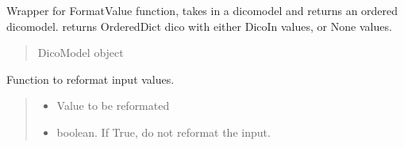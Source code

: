 \documentclass[letterpaper,10pt,english]{sphinxmanual}
\begin{document}
\begin{fulllineitems}
\label{\detokenize{api/killMS.Parset:killMS.Parset.ReadCFG.FormatDico}}
\pysigstartsignatures
{}
\pysigstopsignatures
\sphinxAtStartPar
Wrapper for FormatValue function, takes in a dicomodel and returns an ordered dicomodel.
returns OrderedDict dico with either DicoIn values, or None values.
\begin{quote}\begin{description}
\sphinxAtStartPar
{} \textendash{} DicoModel object

\sphinxAtStartPar
{}

\end{description}\end{quote}

\end{fulllineitems}


\begin{fulllineitems}
\label{\detokenize{api/killMS.Parset:killMS.Parset.ReadCFG.FormatValue}}
\pysigstartsignatures
{}
\pysigstopsignatures
\sphinxAtStartPar
Function to reformat input values.
\begin{quote}\begin{description}
\begin{itemize}
\item {} 
\sphinxAtStartPar
{} \textendash{} Value to be reformated

\item {} 
\sphinxAtStartPar
{} \textendash{} boolean. If True, do not reformat the input.

\end{itemize}

\end{description}\end{quote}

\end{fulllineitems}
\end{document}
